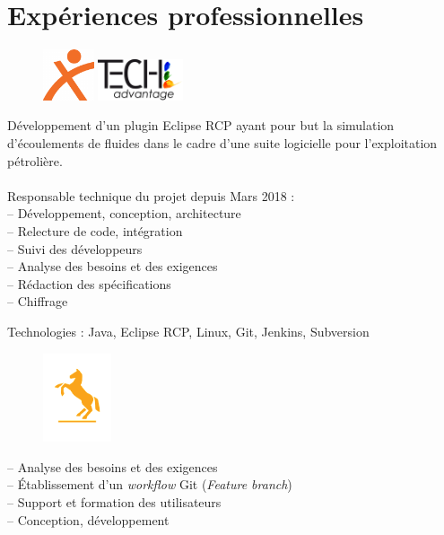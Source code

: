 \documentclass{my_cv_bis} \usepackage{wrapfig}
\begin{document}

\section{Expériences professionnelles}

{
	\vspace{-0.4cm}
	\begin{figure}
		\vspace{0.2cm}
		\centering
		\includegraphics[width=1.5cm]{images/logos/extia.png}\vspace{0.5cm}
		\includegraphics[width=2.5cm]{images/logos/tech_advantage.png}
	\end{figure}	
	 Développement d'un plugin Eclipse RCP ayant pour but la simulation d'écoulements de fluides dans le cadre d'une suite logicielle pour l'exploitation pétrolière.\\~\\
	Responsable technique du projet depuis Mars 2018 :\\
	-- Développement, conception, architecture\\
	-- Relecture de code, intégration\\
	-- Suivi des développeurs\\
	-- Analyse des besoins et des exigences\\
	-- Rédaction des spécifications\\
	-- Chiffrage
}
{
	Technologies : Java, Eclipse RCP, Linux, Git, Jenkins, Subversion 
	\vspace{15px}
	}
{
	\vspace{-0.4cm}
	\begin{figure}
		\vspace{-1cm}
		\includegraphics[width=2cm]{images/logos/continental.png}
	\end{figure}	
-- Analyse des besoins et des exigences\\
-- Établissement d'un \textit{workflow} Git (\textit{Feature branch})\\
-- Support et formation des utilisateurs\\
-- Conception, développement 
}
\end{document}
